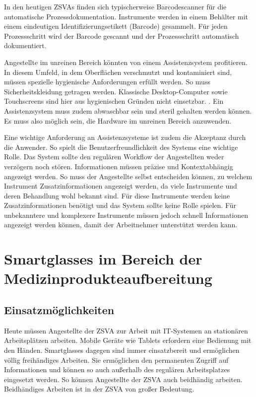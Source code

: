 In den heutigen ZSVAs finden sich typischerweise Barcodescanner für die automatische Prozessdokumentation. Instrumente werden in einem Behälter mit einem eindeutigen Identifizierungsetikett (Barcode) gesammelt. Für jeden Prozessschritt wird der Barcode gescannt und der Prozessschritt automatisch dokumentiert.

Angestellte im unreinen Bereich könnten von einem Assistenzsystem profitieren. 
In diesem Umfeld, in dem Oberflächen verschmutzt und kontaminiert sind, müssen spezielle hygienische Anforderungen erfüllt werden. So muss Sicherheitskleidung getragen werden. Klassische Desktop-Computer sowie Touchscreens sind hier aus hygienischen Gründen nicht einsetzbar.  \cite[S.~28]{Ruther2014}. Ein Assistenzsystem muss zudem abwaschbar sein und steril gehalten werden können. Es muss also möglich sein, die Hardware im unreinen Bereich anzuwenden. 

Eine wichtige Anforderung an Assistenzsysteme ist zudem die Akzeptanz durch die Anwender. So spielt die Benutzerfreundlichkeit des Systems eine wichtige Rolle. Das System sollte den regulären Workflow der Angestellten weder verzögern noch stören. Informationen müssen präzise und Kontextabhängig angezeigt werden. So muss der Angestellte selbst entscheiden können, zu welchem Instrument Zusatzinformationen angezeigt werden, da viele Instrumente und deren Behandlung wohl bekannt sind. Für diese Instrumente werden keine Zusatzinformationen benötigt und das System sollte keine Rolle spielen. Für unbekanntere und komplexere Instrumente müssen jedoch schnell Informationen angezeigt werden können, damit der Arbeitnehmer unterstützt werden kann. \cite[S.~29]{Ruther2014}


%
%
\section{Smartglasses im Bereich der Medizinprodukteaufbereitung}
%
%
\subsection{Einsatzmöglichkeiten}
Heute müssen Angestellte der ZSVA zur Arbeit mit IT-Systemen an stationären Arbeitsplätzen arbeiten. Mobile Geräte wie Tablets erfordern eine Bedienung mit den Händen. Smartglasses dagegen sind immer einsatzbereit und ermöglichen völlig freihändiges Arbeiten. Sie ermöglichen den permanenten Zugriff auf Informationen und können so auch außerhalb des regulären Arbeitsplatzes eingesetzt werden. So können Angestellte der ZSVA auch beidhändig arbeiten. Beidhändiges Arbeiten ist in der ZSVA von großer Bedeutung.

